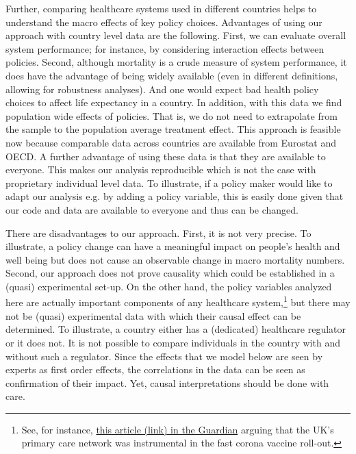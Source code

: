 \documentclass[a4paper,12pt]{article}
\begin{document}
Further, comparing healthcare systems used in different countries helps to understand the macro effects of key policy choices. Advantages of using our approach with country level data are the following. First, we can evaluate overall system performance; for instance, by considering interaction effects between policies. Second, although mortality is a crude measure of system performance, it does have the advantage of being widely available (even in different definitions, allowing for robustness analyses). And one would expect bad health policy choices to affect life expectancy in a country. In addition, with this data we find population wide effects of policies. That is, we do not need to extrapolate from the sample to the population average treatment effect. This approach is feasible now because comparable data across countries are available from Eurostat and OECD. A further advantage of using these data is that they are available to everyone. This makes our analysis reproducible which is not the case with proprietary individual level data. To illustrate, if a policy maker would like to adapt our analysis e.g. by adding a policy variable, this is easily done given that our code and data are available to everyone and thus can be changed.

There are disadvantages to our approach. First, it is not very precise. To illustrate, a policy change can have a meaningful impact on people's health and well being but does not cause an observable change in macro mortality numbers. Second, our approach does not prove causality which could be established in a (quasi) experimental set-up. On the other hand, the policy variables analyzed here are actually important components of any healthcare system,\footnote{See, for instance, \href{https://www.theguardian.com/society/2021/feb/12/coronavirus-shows-what-we-are-capable-of-nhs-vaccine-triumph}{this article (link) in the Guardian} arguing that the UK's primary care network was instrumental in the fast corona vaccine roll-out.} but there may not be (quasi) experimental data with which their causal effect can be determined. To illustrate, a country either has a (dedicated) healthcare regulator or it does not. It is not possible to compare individuals in the country with and without such a regulator. Since the effects that we model below are seen by experts as first order effects, the correlations in the data can be seen as confirmation of their impact. Yet, causal interpretations should be done with care.
\end{document}
